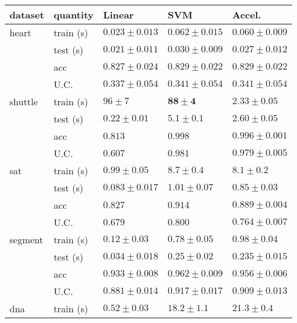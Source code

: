 \begin{tabular}{|ll|lll|}
\hline
dataset & quantity & Linear & SVM & Accel. \\
\hline\hline
heart & train (s) & $\mathbf{       0.023\pm    0.013}$ & $       0.062\pm    0.015$ & $        0.060\pm   0.009$\\
 & test (s)       & $\mathbf{       0.021\pm    0.011}$ & $        0.030\pm   0.009$ & $       0.027\pm    0.012$\\
 & acc       & $       0.827\pm    0.024$ & $\mathbf{       0.829\pm    0.022}$ & $       0.829\pm    0.022$\\
 & U.C.      & $0.337\pm    0.054$ & $\mathbf{0.341\pm    0.054}$ & $       0.341\pm    0.054$\\
\hline
shuttle & train (s) & $        96\pm      7$ & $\mathbf{        88\pm      4}$ & $        2.33\pm    0.05$\\
	       & test (s)       & $\mathbf{0.22\pm    0.01}$ & $        5.1\pm     0.1$ & $2.60\pm    0.05$\\
 & acc       & $       0.813$ & $\mathbf{       0.998}$ & $       0.996\pm   0.001$\\
 & U.C.      & $0.607$ & $\mathbf{0.981}$ & $       0.979\pm   0.005$\\
\hline
sat & train (s) & $\mathbf{       0.99\pm    0.05}$ & $        8.7\pm     0.4$ & $        8.1\pm     0.2$\\
    & test (s)       & $       \mathbf{0.083\pm    0.017}$ & $        1.01\pm    0.07$ & $0.85\pm     0.03$\\
 & acc       & $       0.827$ & $\mathbf{       0.914}$ & $       0.889\pm   0.004$\\
 & U.C.      & $0.679$ & $\mathbf{0.800}$ & $       0.764\pm   0.007$\\
\hline
segment & train (s) & $\mathbf{       0.12\pm    0.03}$ & $       0.78\pm    0.05$ & $       0.98\pm    0.04$\\
 & test (s)       & $\mathbf{       0.034\pm    0.018}$ & $       0.25\pm    0.02$ & $       0.235\pm    0.015$\\
 & acc       & $       0.933\pm   0.008$ & $\mathbf{       0.962\pm   0.009}$ & $       0.956\pm   0.006$\\
 & U.C.      & $0.881\pm    0.014$ & $\mathbf{0.917\pm    0.017}$ & $       0.909\pm    0.013$\\
\hline
dna & train (s) & $\mathbf{       0.52\pm    0.03}$ & $        18.2\pm      1.1$ & $        21.3\pm     0.4$\\

\end{tabular}
